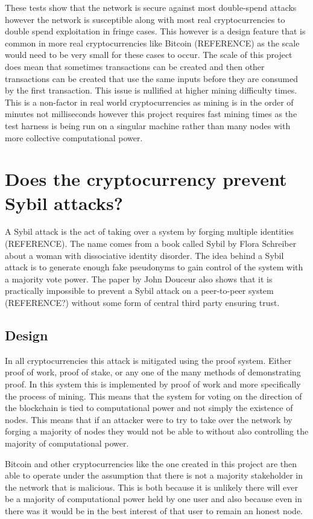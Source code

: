 \documentclass{l4proj}
\begin{document}
These tests show that the network is secure against most double-spend attacks however the network is susceptible
along with most real cryptocurrencies to double spend exploitation in fringe cases. This however is a design feature
that is common in more real cryptocurrencies like Bitcoin (REFERENCE) as the scale would need to be very small for these
cases to occur. The scale of this project does mean that sometimes transactions can be created and then other transactions
can be created that use the same inputs before they are consumed by the first transaction. This issue is nullified 
at higher mining difficulty times. This is a non-factor in real world cryptocurrencies as mining is in the order of 
minutes not milliseconds however this project requires fast mining times as the test harness is being run on a singular
machine rather than many nodes with more collective computational power.

\section{Does the cryptocurrency prevent Sybil attacks?}
A Sybil attack is the act of taking over a system by forging multiple identities (REFERENCE). The name comes from a book
called Sybil by Flora Schreiber about a woman with dissociative identity disorder. The idea behind a Sybil attack is to 
generate enough fake pseudonyms to gain control of the system with a majority vote power. The paper by John Douceur 
also shows that it is practically impossible to prevent a Sybil attack on a peer-to-peer system (REFERENCE?) without some
form of central third party ensuring trust.

\subsection{Design}
In all cryptocurrencies this attack is mitigated using the proof system. Either proof of work, proof of stake, or any one
of the many methods of demonstrating proof. In this system this is implemented by proof of work and more specifically
the process of mining. This means that the system for voting on the direction of the blockchain is tied to computational 
power and not simply the existence of nodes. This means that if an attacker were to try to take over the network by 
forging a majority of nodes they would not be able to without also controlling the majority of computational power.

Bitcoin and other cryptocurrencies like the one created in this project are then able to operate under the assumption
that there is not a majority stakeholder in the network that is malicious. This is both because it is unlikely there will
ever be a majority of computational power held by one user and also because even in there was it would be in the best 
interest of that user to remain an honest node.
\end{document}
